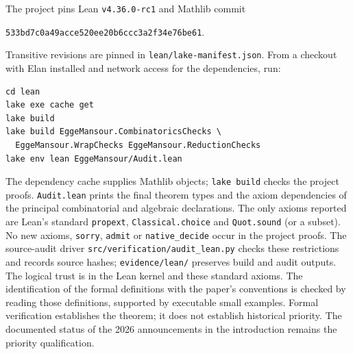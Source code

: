 \documentclass[11pt]{amsart}
\theoremstyle{definition}
\begin{document}
The project pins Lean \texttt{v4.36.0-rc1} and Mathlib commit
\begin{center}
\texttt{533bd7c0a49acce520ee20b6ccc3a2f34e76be61}.
\end{center}
Transitive revisions are pinned in \texttt{lean/lake-manifest.json}. From a checkout with Elan installed and network access for the dependencies, run:
\begin{small}
\begin{verbatim}
cd lean
lake exe cache get
lake build
lake build EggeMansour.CombinatoricsChecks \
  EggeMansour.WrapChecks EggeMansour.ReductionChecks
lake env lean EggeMansour/Audit.lean
\end{verbatim}
\end{small}
The dependency cache supplies Mathlib objects; \texttt{lake build} checks the project proofs. \texttt{Audit.lean} prints the final theorem types and the axiom dependencies of the principal combinatorial and algebraic declarations. The only axioms reported are Lean's standard \texttt{propext}, \texttt{Classical.choice} and \texttt{Quot.sound} (or a subset). No new axioms, \texttt{sorry}, \texttt{admit} or \texttt{native\_decide} occur in the project proofs. The source-audit driver \texttt{src/verification/audit\_lean.py} checks these restrictions and records source hashes; \texttt{evidence/lean/} preserves build and audit outputs. The logical trust is in the Lean kernel and these standard axioms. The identification of the formal definitions with the paper's conventions is checked by reading those definitions, supported by executable small examples. Formal verification establishes the theorem; it does not establish historical priority. The documented status of the 2026 announcements in the introduction remains the priority qualification.

\endgroup
\end{document}
